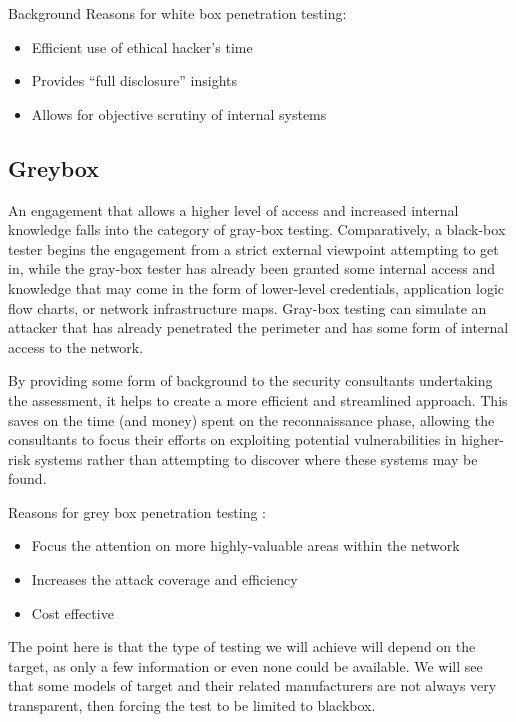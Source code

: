 \begin{chaptercover}{Background}
Reasons for white box penetration testing:
\begin{itemize} \vspace{-.2cm}
  \item[\checkmark] Efficient use of ethical hacker’s time
  \item[\checkmark] Provides “full disclosure” insights
  \item[\checkmark] Allows for objective scrutiny of internal systems
\end{itemize}

\subsection{Greybox}

An engagement that allows a higher level of access and increased internal knowledge falls into the category of gray-box testing. Comparatively, a black-box tester begins the engagement from a strict external viewpoint attempting to get in, while the gray-box tester has already been granted some internal access and knowledge that may come in the form of lower-level credentials, application logic flow charts, or network infrastructure maps. Gray-box testing can simulate an attacker that has already penetrated the perimeter and has some form of internal access to the network.

By providing some form of background to the security consultants undertaking the assessment, it helps to create a more efficient and streamlined approach. This saves on the time (and money) spent on the reconnaissance phase, allowing the consultants to focus their efforts on exploiting potential vulnerabilities in higher-risk systems rather than attempting to discover where these systems may be found.

Reasons for grey box penetration testing :
\begin{itemize} \vspace{-.2cm}
  \item[\checkmark] Focus the attention on more highly-valuable areas within the network
  \item[\checkmark] Increases the attack coverage and efficiency
  \item[\checkmark] Cost effective
\end{itemize}

\begin{info} \hyphenation{}
The point here is that the type of testing we will achieve will depend on the target, as only a few information or even none could be available. We will see that some models of target and their related manufacturers are not always very transparent, then forcing the test to be limited to blackbox.
\end{info}


\end{chaptercover}
